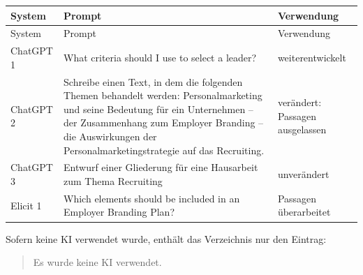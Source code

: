 %
%




\renewcommand{\arraystretch}{2}
\begin{longtable}{p{} p{} p{}}

    \toprule
    \large System & \large Prompt & \large Verwendung\\
    \midrule
    \endfirsthead

    \toprule
    \large System & \large Prompt & \large Verwendung \\
    \midrule
    \endhead

    \bottomrule
    \endfoot

    \bottomrule
    \endlastfoot

    ChatGPT 1 & What criteria should I use to select a leader? & weiterentwickelt \\
    ChatGPT 2 & Schreibe einen Text, in dem die folgenden Themen behandelt werden: Personalmarketing und seine Bedeutung für ein Unternehmen – der Zusammenhang zum Employer Branding – die Auswirkungen der Personalmarketingstrategie auf das Recruiting.  & verändert: Passagen ausgelassen  \\
    ChatGPT 3 & Entwurf einer Gliederung für eine Hausarbeit zum Thema Recruiting  & unverändert \\
    Elicit 1& Which elements should be included in an Employer Branding Plan?  & Passagen überarbeitet  \\

\end{longtable}

Sofern keine KI verwendet wurde, enthält das Verzeichnis nur den Eintrag:
\begin{verse}
    Es wurde keine KI verwendet.
\end{verse}
